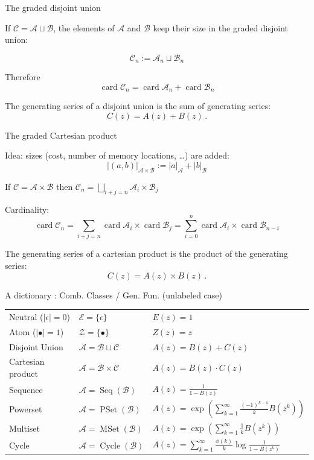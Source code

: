 \documentclass[compress,11pt]{beamer}
\def\opstyle#1{\ensuremath{\operatorname{#1}}}
\newcommand{\card}{\opstyle{card}}
\newcommand{\Seq}{\opstyle{Seq}}
\newcommand{\PSet}{\opstyle{PSet}}
\newcommand{\MSet}{\opstyle{MSet}}
\newcommand{\Cycle}{\opstyle{Cycle}}
\newcommand{\mA}{\mathcal{A}}
\newcommand{\mB}{\mathcal{B}}
\newcommand{\mC}{\mathcal{C}}
\newcommand{\mE}{\mathcal{E}}
\newcommand{\mZ}{\mathcal{Z}}
\begin{document}
\begin{frame}{The graded disjoint union}

  If $\mC = \mA \sqcup \mB$, the elements of $\mA$ and $\mB$ keep their
  size in the graded disjoint union:

  \[\mC_n := \mA_n \sqcup \mB_n\]

  Therefore
  \[\card\mC_n = \card\mA_n + \card\mB_n\]
  \bigskip\pause

  \begin{NOTE}
    The generating series of a disjoint union is the sum of generating
    series: \[C(z) = A(z) + B(z)\,.\]
  \end{NOTE}
\end{frame}

\begin{frame}{The graded Cartesian product}

  Idea: sizes (cost, number of memory locations,
  \dots) are added:
  \[|(a, b)|_{\mA\times\mB} := |a|_\mA + |b|_\mB\]

  If $\mC = \mA \times \mB$ then
  $\displaystyle\mC_n=\bigsqcup_{i+j=n} \mA_i \times \mB_j$
  \pause

  Cardinality:
  \[
  \card\mC_n = \sum_{i+j=n} \card\mA_i \times \card\mB_j =
          \sum_{i=0}^{n} \card\mA_i \times \card\mB_{n-i}
          \]
  \begin{NOTE}
    The generating series of a cartesian product is the product of the
    generating series: \[C(z) = A(z) \times B(z)\,.\]
  \end{NOTE}
\end{frame}

\begin{frame}{A dictionary : Comb. Classes / Gen. Fun. (unlabeled case)}

  \small
  \begin{tabular}{lll}
    Neutral ($|\epsilon| = 0$)& $\mE=\{\epsilon\}$ & $E(z) = 1$\\
    Atom ($|\bullet| = 1$)& $\mZ = \{\bullet\}$ & $Z(z) = z$\\
    Disjoint Union & $\mA = \mB \sqcup \mC$ & $A(z) = B(z) + C(z)$\\
    Cartesian product & $\mA = \mB \times \mC$ & $A(z) = B(z) \cdot C(z)$\\
    Sequence & $\mA = \Seq(\mB)$ & $\displaystyle A(z) = \frac{1}{1- B(z)}$ \\
    Powerset & $\mA = \PSet(\mB)$ &
      $\displaystyle A(z) =
       \exp\left(\sum_{k=1}^{\infty} \frac{(-1)^{k-1}}{k}B(z^k)\right)$ \\
    Multiset & $\mA = \MSet(\mB)$ &
      $\displaystyle A(z) =
       \exp\left(\sum_{k=1}^{\infty} \frac{1}{k}B(z^k)\right)$ \\
    Cycle    & $\mA = \Cycle(\mB)$ &
      $\displaystyle A(z) =
       \sum_{k=1}^{\infty} \frac{\phi(k)}{k}\log\frac{1}{1-B(z^k)}$
  \end{tabular}
\end{frame}
\end{document}
